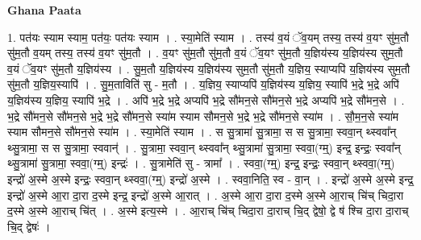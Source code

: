 \documentclass[17pt]{extarticle}
\begin{document}
\textbf{Ghana Paata } \newline

1. पत॑यः स्याम स्याम॒ पत॑यः॒ पत॑यः स्याम । . स्या॒मेति॑ स्याम । . तस्य॑ व॒यं ॅव॒यम् तस्य॒ तस्य॑ व॒यꣳ सु॑म॒तौ सु॑म॒तौ व॒यम् तस्य॒ तस्य॑ व॒यꣳ सु॑म॒तौ । . व॒यꣳ सु॑म॒तौ सु॑म॒तौ व॒यं ॅव॒यꣳ सु॑म॒तौ य॒ज्ञिय॑स्य य॒ज्ञिय॑स्य सुम॒तौ व॒यं ॅव॒यꣳ सु॑म॒तौ य॒ज्ञिय॑स्य । . सु॒म॒तौ य॒ज्ञिय॑स्य य॒ज्ञिय॑स्य सुम॒तौ सु॑म॒तौ य॒ज्ञिय॒ स्याप्यपि॑ य॒ज्ञिय॑स्य सुम॒तौ सु॑म॒तौ य॒ज्ञिय॒स्यापि॑ । . सु॒म॒ताविति॑ सु - म॒तौ । . य॒ज्ञिय॒ स्याप्यपि॑ य॒ज्ञिय॑स्य य॒ज्ञिय॒ स्यापि॑ भ॒द्रे भ॒द्रे अपि॑ य॒ज्ञिय॑स्य य॒ज्ञिय॒ स्यापि॑ भ॒द्रे । . अपि॑ भ॒द्रे भ॒द्रे अप्यपि॑ भ॒द्रे सौ॑मन॒से सौ॑मन॒से भ॒द्रे अप्यपि॑ भ॒द्रे सौ॑मन॒से । . भ॒द्रे सौ॑मन॒से सौ॑मन॒से भ॒द्रे भ॒द्रे सौ॑मन॒से स्या॑म स्याम सौमन॒से भ॒द्रे भ॒द्रे सौ॑मन॒से स्या॑म । . सौ॒म॒न॒से स्या॑म स्याम सौमन॒से सौ॑मन॒से स्या॑म । . स्या॒मेति॑ स्याम । . स सु॒त्रामा॑ सु॒त्रामा॒ स स सु॒त्रामा॒ स्ववा॒न् थ्स्ववा᳚न् थ्सु॒त्रामा॒ स स सु॒त्रामा॒ स्ववान्॑ । . सु॒त्रामा॒ स्ववा॒न् थ्स्ववा᳚न् थ्सु॒त्रामा॑ सु॒त्रामा॒ स्ववा॒(ग्म्॒) इन्द्र॒ इन्द्रः॒ स्ववा᳚न् थ्सु॒त्रामा॑ सु॒त्रामा॒ स्ववा॒(ग्म्॒) इन्द्रः॑ । . सु॒त्रामेति॑ सु - त्रामा᳚ । . स्ववा॒(ग्म्॒) इन्द्र॒ इन्द्रः॒ स्ववा॒न् थ्स्ववा॒(ग्म्॒) इन्द्रो॑ अ॒स्मे अ॒स्मे इन्द्रः॒ स्ववा॒न् थ्स्ववा॒(ग्म्॒) इन्द्रो॑ अ॒स्मे । . स्ववा॒निति॒ स्व - वा॒न् । . इन्द्रो॑ अ॒स्मे अ॒स्मे इन्द्र॒ इन्द्रो॑ अ॒स्मे आ॒रा दा॒रा द॒स्मे इन्द्र॒ इन्द्रो॑ अ॒स्मे आ॒रात् । . अ॒स्मे आ॒रा दा॒रा द॒स्मे अ॒स्मे आ॒राच् चि॑च् चिदा॒रा द॒स्मे अ॒स्मे आ॒राच् चि॑त् । . अ॒स्मे इत्य॒स्मे । . आ॒राच् चि॑च् चिदा॒रा दा॒राच् चि॒द् द्वेषो॒ द्वे ष॑ श्चि दा॒रा दा॒राच् चि॒द् द्वेषः॑ । \newline
\end{document}
